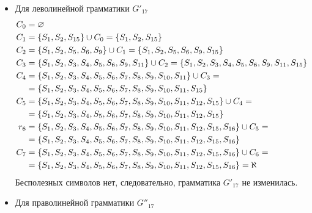 \begin{itemize}
	\item Для леволинейной грамматики \(G'_{17}\)
	      \begin{align*}
		      C_0   & = \varnothing                                                                                                          \\
		      C_1   & = \left\{S_1, S_2, S_{15}\right\} \cup C_0 = \left\{S_1, S_2, S_{15}\right\}                                                             \\
		      C_{2} & = \left\{S_1, S_2, S_5, S_6, S_9\right\} \cup C_{1} = \left\{S_1, S_2, S_5, S_6, S_9, S_{15}\right\}                                     \\
		      C_{3} & = \left\{S_1, S_2, S_3, S_4, S_5, S_6, S_9, S_{11}\right\} \cup C_{2} = \left\{S_1, S_2, S_3, S_4, S_5, S_6, S_9, S_{11}, S_{15}\right\} \\
		      C_{4} & = \left\{S_1, S_2, S_3, S_4, S_5, S_6, S_7, S_8, S_9, S_{10}, S_{11}\right\} \cup C_{3} =                                       \\
		            & = \left\{S_1, S_2, S_3, S_4, S_5, S_6, S_7, S_8, S_9, S_{10}, S_{11}, S_{15}\right\}                                            \\
		      C_{5} & = \left\{S_1, S_2, S_3, S_4, S_5, S_6, S_7, S_8, S_9, S_{10}, S_{11}, S_{12}, S_{15}\right\} \cup C_{4} =                       \\
		            & = \left\{S_1, S_2, S_3, S_4, S_5, S_6, S_7, S_8, S_9, S_{10}, S_{11}, S_{12}, S_{15}\right\}                                    \\
		      r_{6} & = \left\{S_1, S_2, S_3, S_4, S_5, S_6, S_7, S_8, S_9, S_{10}, S_{11}, S_{12}, S_{15}, S_{16}\right\} \cup C_{5} =               \\
		            & = \left\{S_1, S_2, S_3, S_4, S_5, S_6, S_7, S_8, S_9, S_{10}, S_{11}, S_{12}, S_{15}, S_{16}\right\}                            \\
		      C_{7} & = \left\{S_1, S_2, S_3, S_4, S_5, S_6, S_7, S_8, S_9, S_{10}, S_{11}, S_{12}, S_{15}, S_{16}\right\} \cup C_{6} =               \\
		            & = \left\{S_1, S_2, S_3, S_4, S_5, S_6, S_7, S_8, S_9, S_{10}, S_{11}, S_{12}, S_{15}, S_{16}\right\} = \aleph
	      \end{align*}
	      Бесполезных символов нет, следовательно, грамматика \(G'_{17}\) не изменилась.
	\item Для праволинейной грамматики \(G''_{17}\)
	      \begin{align*}

\end{align*}
\end{itemize}
